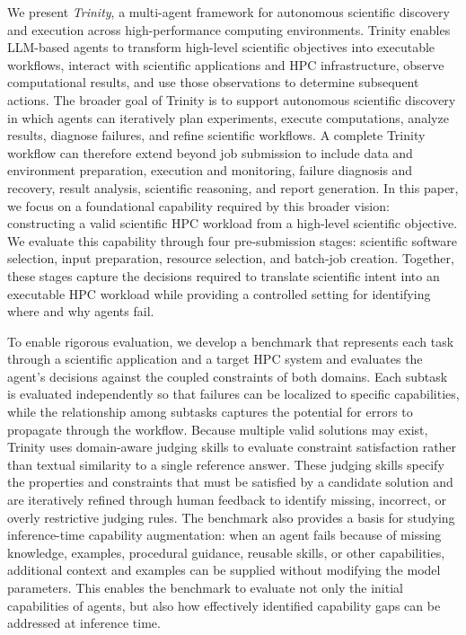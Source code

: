 \documentclass[conference]{IEEEtran}
\begin{document}
We present \textit{Trinity}, a multi-agent framework for autonomous scientific discovery and execution across high-performance computing environments. Trinity enables LLM-based agents to transform high-level scientific objectives into executable workflows, interact with scientific applications and HPC infrastructure, observe computational results, and use those observations to determine subsequent actions. The broader goal of Trinity is to support autonomous scientific discovery in which agents can iteratively plan experiments, execute computations, analyze results, diagnose failures, and refine scientific workflows. A complete Trinity workflow can therefore extend beyond job submission to include data and environment preparation, execution and monitoring, failure diagnosis and recovery, result analysis, scientific reasoning, and report generation. In this paper, we focus on a foundational capability required by this broader vision: constructing a valid scientific HPC workload from a high-level scientific objective. We evaluate this capability through four pre-submission stages: scientific software selection, input preparation, resource selection, and batch-job creation. Together, these stages capture the decisions required to translate scientific intent into an executable HPC workload while providing a controlled setting for identifying where and why agents fail.

To enable rigorous evaluation, we develop a benchmark that represents each task through a scientific application and a target HPC system and evaluates the agent's decisions against the coupled constraints of both domains. Each subtask is evaluated independently so that failures can be localized to specific capabilities, while the relationship among subtasks captures the potential for errors to propagate through the workflow. Because multiple valid solutions may exist, Trinity uses domain-aware judging skills to evaluate constraint satisfaction rather than textual similarity to a single reference answer. These judging skills specify the properties and constraints that must be satisfied by a candidate solution and are iteratively refined through human feedback to identify missing, incorrect, or overly restrictive judging rules. The benchmark also provides a basis for studying inference-time capability augmentation: when an agent fails because of missing knowledge, examples, procedural guidance, reusable skills, or other capabilities, additional context and examples can be supplied without modifying the model parameters. This enables the benchmark to evaluate not only the initial capabilities of agents, but also how effectively identified capability gaps can be addressed at inference time.
\end{document}
